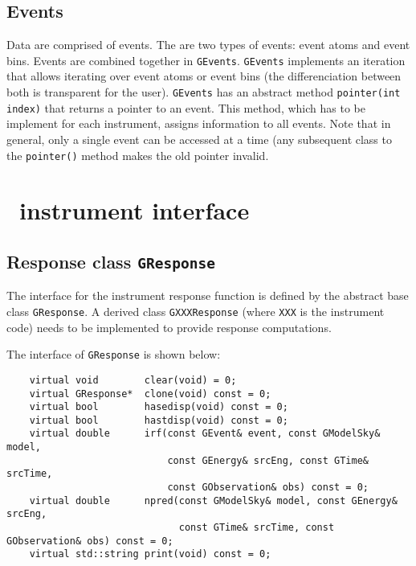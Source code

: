 \documentclass{article}[12pt,a4]
\begin{document}
\subsection{Events}

Data are comprised of events.
The are two types of events: event atoms and event bins.
Events are combined together in {\tt GEvents}.
{\tt GEvents} implements an iteration that allows iterating over event atoms or event bins
(the differenciation between both is transparent for the user).
{\tt GEvents} has an abstract method {\tt pointer(int index)} that returns a pointer to an
event.
This method, which has to be implement for each instrument, assigns information to
all events.
Note that in general, only a single event can be accessed at a time (any subsequent
class to the {\tt pointer()} method makes the old pointer invalid.


\section{\this\ instrument interface}

\subsection{Response class {\tt GResponse}}
\label{sec:GResponse}

The interface for the instrument response function is defined by the abstract base
class {\tt GResponse}.
A derived class {\tt GXXXResponse} (where {\tt XXX} is the instrument code) needs
to be implemented to provide response computations.

The interface of {\tt GResponse} is shown below:
\begin{verbatim}
    virtual void        clear(void) = 0;
    virtual GResponse*  clone(void) const = 0;
    virtual bool        hasedisp(void) const = 0;
    virtual bool        hastdisp(void) const = 0;
    virtual double      irf(const GEvent& event, const GModelSky& model,
                            const GEnergy& srcEng, const GTime& srcTime,
                            const GObservation& obs) const = 0;
    virtual double      npred(const GModelSky& model, const GEnergy& srcEng,
                              const GTime& srcTime, const GObservation& obs) const = 0;
    virtual std::string print(void) const = 0;
\end{verbatim}
\end{document}
